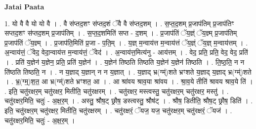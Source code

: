 \documentclass[17pt]{extarticle}
\begin{document}
\textbf{Jatai Paata} \newline

1. यो वै वै यो यो वै । . वै स॑प्तद॒शꣳ स॑प्तद॒शं ॅवै वै स॑प्तद॒शम् । . स॒प्त॒द॒शम् प्र॒जाप॑तिम् प्र॒जाप॑तिꣳ सप्तद॒शꣳ स॑प्तद॒शम् प्र॒जाप॑तिम् । . स॒प्त॒द॒शमिति॑ सप्त - द॒शम् । . प्र॒जाप॑तिं ॅय॒ज्ञ्ं ॅय॒ज्ञ्म् प्र॒जाप॑तिम् प्र॒जाप॑तिं ॅय॒ज्ञ्म् । . प्र॒जाप॑ति॒मिति॑ प्र॒जा - प॒ति॒म् । . य॒ज्ञ् म॒न्वाय॑त्त म॒न्वाय॑त्तं ॅय॒ज्ञ्ं ॅय॒ज्ञ् म॒न्वाय॑त्तम् । . अ॒न्वाय॑त्तं॒ ॅवेद॒ वेदा॒न्वाय॑त्त म॒न्वाय॑त्तं॒ ॅवेद॑ । . अ॒न्वाय॑त्त॒मित्य॑नु - आय॑त्तम् । . वेद॒ प्रति॒ प्रति॒ वेद॒ वेद॒ प्रति॑ । . प्रति॑ य॒ज्ञेन॑ य॒ज्ञेन॒ प्रति॒ प्रति॑ य॒ज्ञेन॑ । . य॒ज्ञेन॑ तिष्ठति तिष्ठति य॒ज्ञेन॑ य॒ज्ञेन॑ तिष्ठति । . ति॒ष्ठ॒ति॒ न न ति॑ष्ठति तिष्ठति॒ न । . न य॒ज्ञाद् य॒ज्ञान् न न य॒ज्ञात् । . य॒ज्ञाद् भ्र(ग्म्॑)शते भ्रꣳशते य॒ज्ञाद् य॒ज्ञाद् भ्र(ग्म्॑)शते । . भ्र॒(ग्म्॒)श॒त॒ आ भ्र(ग्म्॑)शते भ्रꣳशत॒ आ । . आ श्रा॑वय श्राव॒या श्रा॑वय । . श्रा॒व॒ये तीति॑ श्रावय श्राव॒ये ति॑ । . इति॒ चतु॑रक्षर॒म् चतु॑रक्षर॒ मितीति॒ चतु॑रक्षरम् । . चतु॑रक्षर॒ मस्त्वस्तु॒ चतु॑रक्षर॒म् चतु॑रक्षर॒ मस्तु॑ । . चतु॑रक्षर॒मिति॒ चतुः॑ - अ॒क्ष॒र॒म् । . अस्तु॒ श्रौष॒ट् छ्रौष॒ डस्त्वस्तु॒ श्रौष॑ट् । . श्रौष॒ डितीति॒ श्रौष॒ट् छ्रौष॒ डिति॑ । . इति॒ चतु॑रक्षर॒म् चतु॑रक्षर॒ मितीति॒ चतु॑रक्षरम् । . चतु॑रक्षरं॒ ॅयज॒ यज॒ चतु॑रक्षर॒म् चतु॑रक्षरं॒ ॅयज॑ । . चतु॑रक्षर॒मिति॒ चतुः॑ - अ॒क्ष॒र॒म् । \newline
\end{document}
